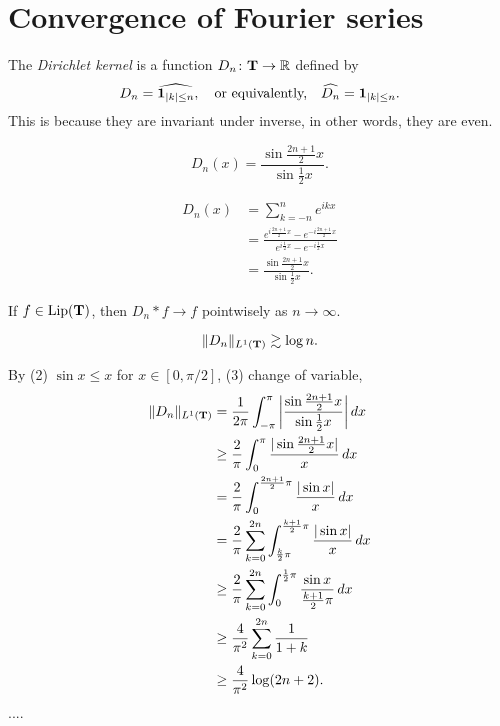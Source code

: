 \documentclass{../crs}
\begin{document}
\section{Convergence of Fourier series}
\begin{defn}
The \emph{Dirichlet kernel} is a function $D_n\colon \bT\to\R$ defined by
\[D_n=\widehat{\bold{1}_{|k|\le n}},\quad\text{or equivalently,}\quad\widehat{D_n}=\bold{1}_{|k|\le n}.\]
This is because they are invariant under inverse, in other words, they are even.
\end{defn}

\begin{thm}
\[D_n(x)=\frac{\sin\frac{2n+1}2x}{\sin\frac12x}.\]
\end{thm}
\begin{pf}
\begin{align*}
D_n(x)&=\sum_{k=-n}^ne^{ikx}\\
&=\frac{e^{i\frac{2n+1}2x}-e^{-i\frac{2n+1}2x}}{e^{i\frac12x}-e^{-i\frac12x}}\\
&=\frac{\sin\frac{2n+1}2x}{\sin\frac12x}.
\end{align*}

\end{pf}

\begin{thm}
If $f\in\operatorname{Lip}(\mathbf{T})$, then $D_n*f\to f$ pointwisely as $n\to\infty$.
\end{thm}

\begin{thm}
\[\|D_n\|_{L^1(\mathbf{T})}\gtrsim\log n.\]
\end{thm}
\begin{pf}
By (2) $\sin x\le x$ for $x\in[0,\pi/2]$, (3) change of variable,
\begin{align*}
\|D_n\|_{L^1(\mathbf{T})}
&=\frac1{2\pi}\int_{-\pi}^\pi\left\lvert\frac{\sin\frac{2n+1}2x}{\sin\frac12x}\right\rvert dx\\
&\ge\frac2\pi\int_0^\pi\frac{|\sin\frac{2n+1}2x|}x\,dx\\
&=\frac2\pi\int_0^{\frac{2n+1}2\pi}\frac{|\sin x|}x\,dx\\
&=\frac2\pi\sum_{k=0}^{2n}\int_{\frac k2\pi}^{\frac{k+1}2\pi}\frac{|\sin x|}x\,dx\\
&\ge\frac2\pi\sum_{k=0}^{2n}\int_0^{\frac12\pi}\frac{\sin x}{\frac{k+1}2\pi}\,dx\\
&\ge\frac4{\pi^2}\sum_{k=0}^{2n}\frac1{1+k}\\
&\ge\frac4{\pi^2}\log(2n+2).
\end{align*}....
\end{pf}
\end{document}
